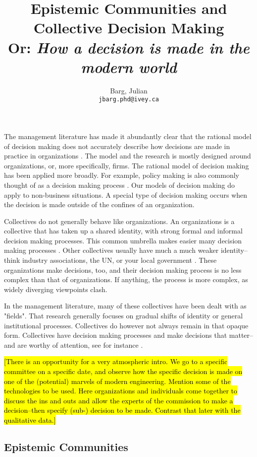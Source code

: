 \documentclass{article}
\title{Epistemic Communities and Collective Decision Making\\

{\large Or: \textit{How a decision is made in the modern world}}}
\author{
	Barg, Julian\\
	\texttt{jbarg.phd@ivey.ca}
}
\begin{document}
	\maketitle

	\newpage

	The management literature has made it abundantly clear that the rational model of decision making does not accurately describe how decisions are made in practice in organizations \citep{Eisenhardt1992}. The model and the research is mostly designed around organizations, or, more specifically, firms. The rational model of decision making has been applied more broadly. For example, policy making is also commonly thought of as a decision making process \citep{Allison1969}. Our models of decision making do apply to non-business situations. A special type of decision making occurs when the decision is made outside of the confines of an organization.

	Collectives do not generally behave like organizations. An organizations is a collective that has taken up a shared identity, with strong formal and informal decision making processes. This common umbrella makes easier many decision making processes \citep{Coase1937}. Other collectives usually have much a much weaker identity--think industry associations, the UN, or your local government \citep[cf.][]{March1995}. These organizations make decisions, too, and their decision making process is no less complex than that of organizations. If anything, the process is more complex, as widely diverging viewpoints clash.

	In the management literature, many of these collectives have been dealt with as "fields". That research generally focuses on gradual shifts of identity or general institutional processes. Collectives do however not always remain in that opaque form. Collectives have decision making processes and make decisions that matter--and are worthy of attention, see for instance \citet{Schussler2014}.

	\hl{[There is an opportunity for a very atmospheric intro. We go to a specific committee on a specific date, and observe how the specific decision is made on one of the (potential) marvels of modern engineering. Mention some of the technologies to be used. Here organizations and individuals come together to discuss the ins and outs and allow the experts of the commission to make a decision--then specify (sub-) decision to be made. Contrast that later with the qualitative data.]}

	\subsection*{Epistemic Communities}
\end{document}
